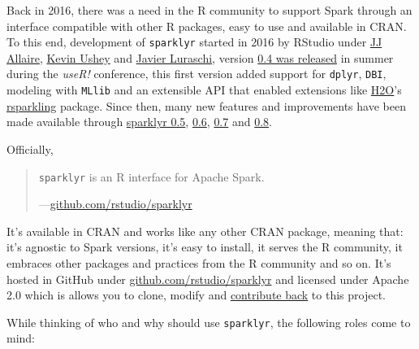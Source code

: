 \documentclass[]{book}
\theoremstyle{definition}
\theoremstyle{definition}
\theoremstyle{definition}
\theoremstyle{remark}
\begin{document}
Back in 2016, there was a need in the R community to support Spark
through an interface compatible with other R packages, easy to use and
available in CRAN. To this end, development of \texttt{sparklyr} started
in 2016 by RStudio under \href{https://github.com/jjallaire}{JJ
Allaire}, \href{https://github.com/kevinushey}{Kevin Ushey} and
\href{https://github.com/javierluraschi}{Javier Luraschi}, version
\href{https://blog.rstudio.com/2016/09/27/sparklyr-r-interface-for-apache-spark/}{0.4
was released} in summer during the \emph{useR!} conference, this first
version added support for \texttt{dplyr}, \texttt{DBI}, modeling with
\texttt{MLlib} and an extensible API that enabled extensions like
\href{https://www.h2o.ai/}{H2O}'s
\href{https://github.com/h2oai/rsparkling/}{rsparkling} package. Since
then, many new features and improvements have been made available
through
\href{https://blog.rstudio.com/2017/01/24/sparklyr-0-5/}{sparklyr 0.5},
\href{https://blog.rstudio.com/2017/07/31/sparklyr-0-6/}{0.6},
\href{https://blog.rstudio.com/2018/01/29/sparklyr-0-7/}{0.7} and
\href{https://blog.rstudio.com/2018/05/14/sparklyr-0-8/}{0.8}.

Officially,

\begin{quote}
\texttt{sparklyr} is an R interface for Apache Spark.

---\href{https://github.com/rstudio/sparklyr}{github.com/rstudio/sparklyr}
\end{quote}

It's available in CRAN and works like any other CRAN package, meaning
that: it's agnostic to Spark versions, it's easy to install, it serves
the R community, it embraces other packages and practices from the R
community and so on. It's hosted in GitHub under
\href{https://github.com/rstudio/sparklyr}{github.com/rstudio/sparklyr}
and licensed under Apache 2.0 which is allows you to clone, modify and
\protect\hyperlink{contributing}{contribute back} to this project.

While thinking of who and why should use \texttt{sparklyr}, the
following roles come to mind:
\end{document}
